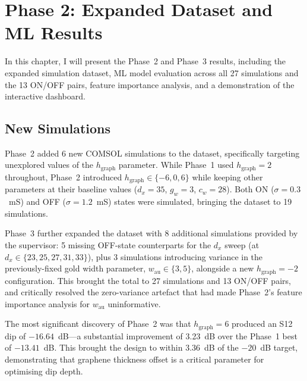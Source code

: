 \documentclass[12pt,a4paper]{report}
\begin{document}
\chapter{Phase 2: Expanded Dataset and ML Results}
\label{ch:phase2}

In this chapter, I will present the Phase~2 and Phase~3 results, including the expanded simulation dataset, ML model evaluation across all 27 simulations and the 13 ON/OFF pairs, feature importance analysis, and a demonstration of the interactive dashboard.

\section{New Simulations}
\label{sec:new_sims}

Phase~2 added 6 new COMSOL simulations to the dataset, specifically targeting unexplored values of the $h_{\text{graph}}$ parameter. While Phase~1 used $h_{\text{graph}} = 2$ throughout, Phase~2 introduced $h_{\text{graph}} \in \{-6, 0, 6\}$ while keeping other parameters at their baseline values ($d_x = 35$, $g_w = 3$, $c_w = 28$). Both ON ($\sigma = 0.3$~mS) and OFF ($\sigma = 1.2$~mS) states were simulated, bringing the dataset to 19 simulations.

Phase~3 further expanded the dataset with 8 additional simulations provided by the supervisor: 5 missing OFF-state counterparts for the $d_x$ sweep (at $d_x \in \{23, 25, 27, 31, 33\}$), plus 3 simulations introducing variance in the previously-fixed gold width parameter, $w_{\text{au}} \in \{3, 5\}$, alongside a new $h_{\text{graph}} = -2$ configuration. This brought the total to 27 simulations and 13 ON/OFF pairs, and critically resolved the zero-variance artefact that had made Phase~2's feature importance analysis for $w_{\text{au}}$ uninformative.

The most significant discovery of Phase~2 was that $h_{\text{graph}} = 6$ produced an S12 dip of $-16.64$~dB---a substantial improvement of 3.23~dB over the Phase~1 best of $-13.41$~dB. This brought the design to within 3.36~dB of the $-20$~dB target, demonstrating that graphene thickness offset is a critical parameter for optimising dip depth.
\end{document}
